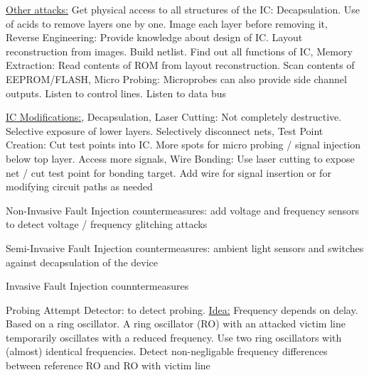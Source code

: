 \documentclass[landscape, a4paper]{article}
\begin{document}
\begin{minipage}[t]{0.2\linewidth}
	\begin{betterlist}
		\item \underline{Other attacks:} \alert{Get physical access to all structures of the IC:} Decapsulation. Use of acids to remove layers one by one. Image each layer before removing it, \alert{Reverse Engineering:} Provide knowledge about design of IC. Layout reconstruction from images. Build netlist. Find out all functions of IC, \alert{Memory Extraction:} Read contents of ROM from layout reconstruction. Scan contents of EEPROM/FLASH, \alert{Micro Probing:} Microprobes can also provide side channel outputs. Listen to control lines. Listen to data bus
		\item \underline{IC Modifications:}, \alert{Decapsulation}, \alert{Laser Cutting:} Not completely destructive. Selective exposure of lower layers. Selectively disconnect nets, \alert{Test Point Creation:} Cut test points into IC. More spots for micro probing / signal injection below top layer. Access more signals, \alert{Wire Bonding:} Use laser cutting to expose net / cut test point for bonding target. Add wire for signal insertion or for modifying circuit paths as needed
	\end{betterlist}
	\begin{betterlist}
		\item \alert{Non-Invasive Fault Injection countermeasures:} add voltage and frequency sensors to detect voltage / frequency glitching attacks
		\item \alert{Semi-Invasive Fault Injection countermeasures:} ambient light sensors and switches against decapsulation of the device
		\item \alert{Invasive Fault Injection counntermeasures}
		\begin{betterlist}
			\item \alert{Probing Attempt Detector:} to detect probing. \underline{Idea:} Frequency depends on delay. Based on a ring oscillator. A \alert{ring oscillator (RO)} with an attacked victim line temporarily oscillates with a reduced frequency. Use two ring oscillators with (almost) identical frequencies. Detect non-negligable frequency differences between reference RO and RO with victim line


\end{betterlist}
\end{betterlist}
\end{minipage}
\end{document}
